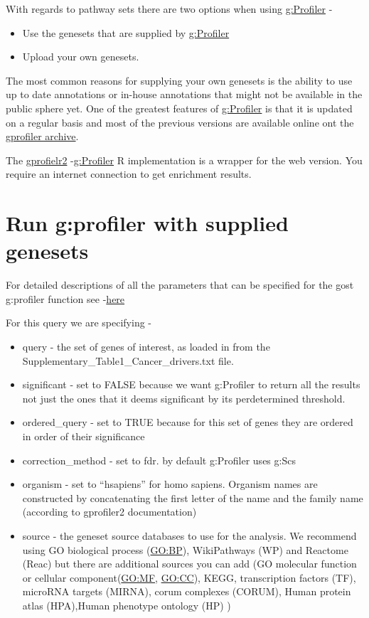 \documentclass[
]{book}
\providecommand{\tightlist}{%
  \setlength{\itemsep}{0pt}\setlength{\parskip}{0pt}}
\begin{document}
With regards to pathway sets there are two options when using \href{https://biit.cs.ut.ee/gprofiler/gost}{g:Profiler} -

\begin{itemize}
\tightlist
\item
  Use the genesets that are supplied by \href{https://biit.cs.ut.ee/gprofiler/gost}{g:Profiler}
\item
  Upload your own genesets.
\end{itemize}

The most common reasons for supplying your own genesets is the ability to use up to date annotations or in-house annotations that might not be available in the public sphere yet. One of the greatest features of \href{https://biit.cs.ut.ee/gprofiler/gost}{g:Profiler} is that it is updated on a regular basis and most of the previous versions are available online ont the \href{https://biit.cs.ut.ee/gprofiler/page/archives}{gprofiler archive}.

The \href{https://biit.cs.ut.ee/gprofiler/page/r}{gprofielr2} -\href{https://biit.cs.ut.ee/gprofiler/gost}{g:Profiler} R implementation is a wrapper for the web version. You require an internet connection to get enrichment results.

\section{Run g:profiler with supplied genesets}\label{run-gprofiler-with-supplied-genesets}

For detailed descriptions of all the parameters that can be specified for the gost g:profiler function see -\href{https://rdrr.io/cran/gprofiler2/man/gost.html}{here}

For this query we are specifying -

\begin{itemize}
\tightlist
\item
  query - the set of genes of interest, as loaded in from the Supplementary\_Table1\_Cancer\_drivers.txt file.
\item
  significant - set to FALSE because we want g:Profiler to return all the results not just the ones that it deems significant by its perdetermined threshold.
\item
  ordered\_query - set to TRUE because for this set of genes they are ordered in order of their significance
\item
  correction\_method - set to fdr. by default g:Profiler uses g:Scs
\item
  organism - set to ``hsapiens'' for homo sapiens. Organism names are constructed by concatenating the first letter of the name and the family name (according to gprofiler2 documentation)
\item
  source - the geneset source databases to use for the analysis. We recommend using GO biological process (\url{GO:BP}), WikiPathways (WP) and Reactome (Reac) but there are additional sources you can add (GO molecular function or cellular component(\url{GO:MF}, \url{GO:CC}), KEGG, transcription factors (TF), microRNA targets (MIRNA), corum complexes (CORUM), Human protein atlas (HPA),Human phenotype ontology (HP) )
\end{itemize}
\end{document}
